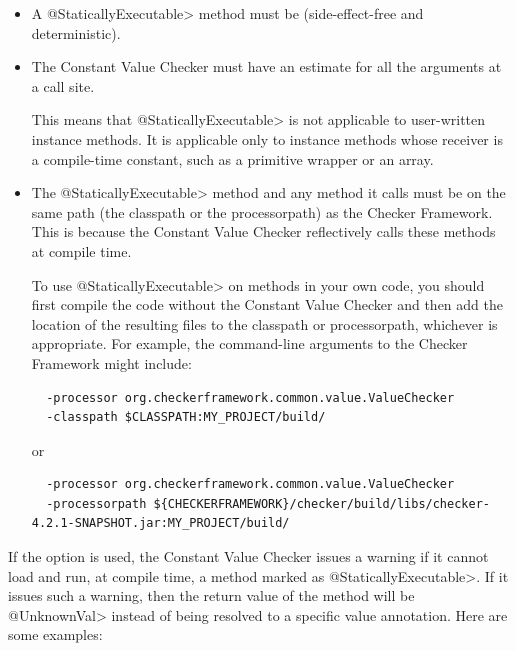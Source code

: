 \begin{itemize}
\item
  A \<@StaticallyExecutable> method must be
   (side-effect-free and deterministic).

\item
  The Constant Value Checker must have an estimate for all the arguments at
  a call site.

  This means that \<@StaticallyExecutable> is not applicable
  to user-written instance methods.  It is applicable only to instance
  methods whose receiver is a compile-time constant, such as a primitive
  wrapper or an array.

\item
  The \<@StaticallyExecutable> method and any method it calls must be on
  the same path (the classpath or the processorpath) as the Checker
  Framework.  This is because the Constant Value Checker reflectively calls
  these methods at compile time.

To use \<@StaticallyExecutable> on methods in your own code, you should
first compile the code without the Constant Value Checker and then add
the location of the resulting  files to the
classpath or processorpath, whichever is appropriate. For example, the
command-line arguments to the Checker Framework
might include:
\begin{Verbatim}
  -processor org.checkerframework.common.value.ValueChecker
  -classpath $CLASSPATH:MY_PROJECT/build/
\end{Verbatim}
or
\begin{Verbatim}
  -processor org.checkerframework.common.value.ValueChecker
  -processorpath ${CHECKERFRAMEWORK}/checker/build/libs/checker-4.2.1-SNAPSHOT.jar:MY_PROJECT/build/
\end{Verbatim}

\end{itemize}



If the option  is used, the Constant Value Checker issues a warning if it cannot load and run, at
compile time, a method marked as \<@StaticallyExecutable>.  If it issues
such a warning, then the return value of the method will be \<@UnknownVal>
instead of being resolved to a specific value annotation.
Here are some examples:

